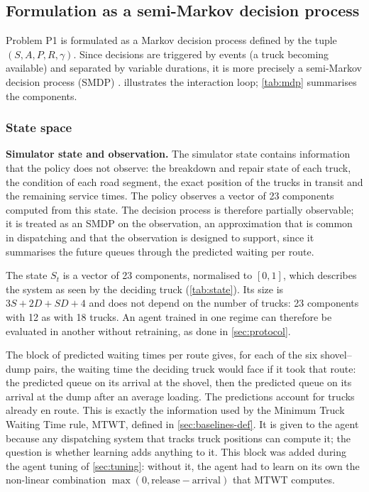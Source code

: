\documentclass[11pt,a4paper]{article}
\newif\ifrevmarks
\newcommand{\revtag}[1]{\ifrevmarks\textsuperscript{\textcolor{red!70!black}{\scriptsize[#1]}}\fi}
\newenvironment{revbloc}[1]{\par\ifrevmarks\color{revcolor}\noindent\revtag{#1}\ \fi}{\par}
\newif\ifcorrmarks
\newcommand{\corr}[1]{\ifcorrmarks\textcolor{corrcolor}{#1}\else#1\fi}
\begin{document}
\subsection{Formulation as a semi-Markov decision process}
\label{sec:smdp}

\begin{revbloc}{M9, M24, Dir. 30/09}
Problem P1 is formulated as a Markov decision process \cite{Puterman1994, RichardSutton2018} defined by the tuple $(S, A, P, R, \gamma)$. Since decisions are triggered by events (a truck becoming available) and separated by variable durations, it is more precisely a semi-Markov decision process \corr{(SMDP)} \cite{BradtkeDuff1995, SuttonPrecupSingh1999}.  illustrates the interaction loop; \cref{tab:mdp} summarises the components.
\end{revbloc}

\subsubsection{State space}

\begin{revbloc}{M1, N1, N2, N3, v3}
\corr{\textbf{Simulator state and observation.} The simulator state contains information that the policy does not observe: the breakdown and repair state of each truck, the condition of each road segment, the exact position of the trucks in transit and the remaining service times. The policy observes a vector of 23 components computed from this state. The decision process is therefore partially observable; it is treated as an \corr{SMDP} on the observation, an approximation that is common in dispatching and that the observation is designed to support, since it summarises the future queues through the predicted waiting per route.}

The state $S_t$ is a vector of 23 components, normalised to $[0,1]$, which describes the system as seen by the deciding truck (\cref{tab:state}). Its size is $3S + 2D + SD + 4$ and does not depend on the number of trucks: 23 components with 12 as with 18 trucks. An agent trained in one regime can therefore be evaluated in another without retraining, as done in \cref{sec:protocol}.

The block of predicted waiting times per route gives, for each of the six shovel--dump pairs, the waiting time the deciding truck would face if it took that route: the predicted queue on its arrival at the shovel, then the predicted queue on its arrival at the dump after an average loading. The predictions account for trucks already en route. This is exactly the information used by the Minimum Truck Waiting Time rule, MTWT, defined in \cref{sec:baselines-def}. \corr{It is given to the agent because any dispatching system that tracks truck positions can compute it; the question is whether learning adds anything to it.} This block was added during the agent tuning of \cref{sec:tuning}: without it, the agent had to learn on its own the non-linear combination $\max(0, \text{release} - \text{arrival})$ that MTWT computes.
\end{revbloc}
\end{document}
